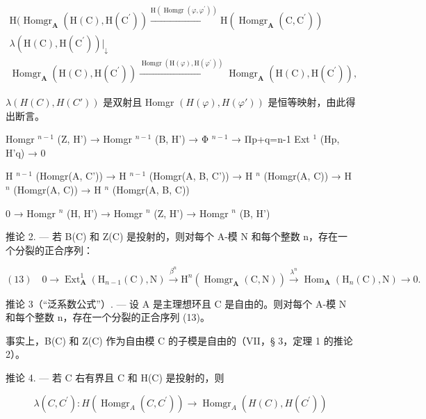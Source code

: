 \[
\begin{array}{l} \mathrm{H} (\operatorname{Homgr} _ {\mathbf {A}} (\mathrm{H} (\mathrm{C}), \mathrm{H} (\mathrm{C} ^ {\prime})) \xrightarrow {\mathrm{H} (\operatorname{Homgr} (\varphi , \varphi^ {\prime}))} \mathrm{H} (\operatorname{Homgr} _ {\mathbf {A}} (\mathrm{C}, \mathrm{C} ^ {\prime})) \\ \lambda (\mathrm{H} (\mathrm{C}), \mathrm{H} (\mathrm{C} ^ {\prime})) \Big | _ {\downarrow} \\ \operatorname{Homgr} _ {\mathbf {A}} (\mathrm{H} (\mathrm{C}), \mathrm{H} (\mathrm{C} ^ {\prime})) \xrightarrow {\operatorname{Homgr} (\mathrm{H} (\varphi) , \mathrm{H} (\varphi^ {\prime}))} \operatorname{Homgr} _ {\mathbf {A}} (\mathrm{H} (\mathrm{C}), \mathrm{H} (\mathrm{C} ^ {\prime}))  , \end{array}
\]

\(\lambda(H(C), H(C'))\) 是双射且 Homgr \((H(\varphi), H(\varphi'))\) 是恒等映射，由此得出断言。

Homgr \(^{n-1}\) (Z, H') → Homgr \(^{n-1}\) (B, H') → Φ \(^{n-1}\) → Πp+q=n-1 Ext \(^{1}\) (Hp, H'q) → 0

H \(^{n-1}\) (Homgr(A, C')) → H \(^{n-1}\) (Homgr(A, B, C')) → H \(^{n}\) (Homgr(A, C)) → H \(^{n}\) (Homgr(A, C)) → H \(^{n}\) (Homgr(A, B, C))

0 → Homgr \(^{n}\) (H, H') → Homgr \(^{n}\) (Z, H') → Homgr \(^{n}\) (B, H')

推论 2. --- 若 B(C) 和 Z(C) 是投射的，则对每个 A-模 N 和每个整数 n，存在一个分裂的正合序列：

\[
(1 3) \quad 0 \longrightarrow \operatorname{Ext} _ {\mathbf {A}} ^ {1} \left(\mathrm{H} _ {n - 1} (\mathrm{C}), \mathrm{N}\right) \xrightarrow {\beta^ {n}} \mathrm{H} ^ {n} \left(\operatorname{Homgr} _ {\mathbf {A}} (\mathrm{C}, \mathrm{N})\right) \xrightarrow {\lambda^ {n}} \operatorname{Hom} _ {\mathbf {A}} \left(\mathrm{H} _ {n} (\mathrm{C}), \mathrm{N}\right) \longrightarrow 0.
\]

推论 3（“泛系数公式”）. --- 设 A 是主理想环且 C 是自由的。则对每个 A-模 N 和每个整数 n，存在一个分裂的正合序列 (13)。

事实上，B(C) 和 Z(C) 作为自由模 C 的子模是自由的（VII，§ 3，定理 1 的推论 2）。

推论 4. --- 若 C 右有界且 C 和 H(C) 是投射的，则

\[
\lambda (C, C ^ {\prime}): H \left(\operatorname{Homgr} _ {A} (C, C ^ {\prime})\right)\rightarrow \operatorname{Homgr} _ {A} \left(H (C), H \left(C ^ {\prime}\right)\right)
\]

